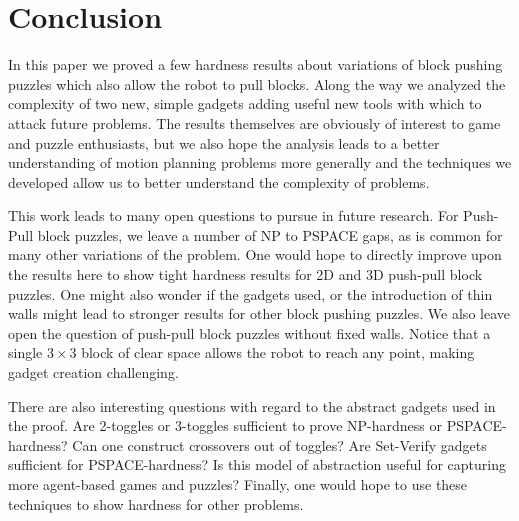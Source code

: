 \section{Conclusion}
In this paper we proved a few hardness results about variations of block pushing puzzles which also allow the robot to pull blocks. Along the way we analyzed the complexity of two new, simple gadgets adding useful new tools with which to attack future problems. The results themselves are obviously of interest to game and puzzle enthusiasts, but we also hope the analysis leads to a better understanding of motion planning problems more generally and the techniques we developed allow us to better understand the complexity of problems.

This work leads to many open questions to pursue in future research. For Push-Pull block puzzles, we leave a number of NP to PSPACE gaps, as is common for many other variations of the problem. One would hope to directly improve upon the results here to show tight hardness results for 2D and 3D push-pull block puzzles. One might also wonder if the gadgets used, or the introduction of thin walls might lead to stronger results for other block pushing puzzles. We also leave open the question of push-pull block puzzles without fixed walls. Notice that a single $3\times3$ block of clear space allows the robot to reach any point, making gadget creation challenging.

There are also interesting questions with regard to the abstract gadgets used in the proof. Are 2-toggles or 3-toggles sufficient to prove NP-hardness or PSPACE-hardness? Can one construct crossovers out of toggles? Are Set-Verify gadgets sufficient for PSPACE-hardness? Is this model of abstraction useful for capturing more agent-based games and puzzles? Finally, one would hope to use these techniques to show hardness for other problems.
%
%
